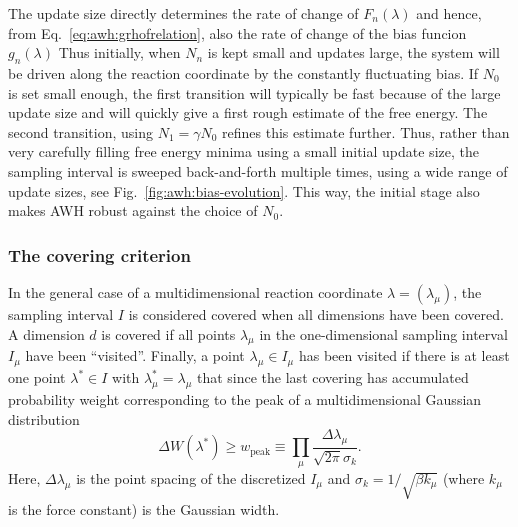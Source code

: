 The update size %
directly determines the rate of change of $F_n(\lambda)$ and hence,
from Eq.~\ref{eq:awh:grhofrelation}, 
also the rate of change of the bias funcion $g_n(\lambda)$ 
Thus initially, when $N_n$ is kept small and updates large,
the system will be driven along the reaction coordinate by the constantly fluctuating bias.
If $N_0$ is set small enough, 
the first transition will typically be fast because of the large update size
and will quickly give a first rough estimate of the free energy.
The second transition, using $N_1=\gamma N_0$  refines this estimate further.
Thus, rather than very carefully filling free energy minima using a small initial update size,
the sampling interval is sweeped back-and-forth multiple times,
using a wide range of update sizes,
see Fig.~\ref{fig:awh:bias-evolution}.
This way, the initial stage also  makes AWH robust against the choice of $N_0$.

\subsubsection{The covering criterion}
In the general case of a multidimensional reaction coordinate $\lambda=(\lambda_\mu)$,
the  sampling interval $I$ is considered covered when all dimensions have been covered.
A dimension $d$ is covered if all points $\lambda_\mu$ in the one-dimensional sampling interval
 $I_\mu$ have been ``visited''.
Finally, a point $\lambda_\mu \in I_\mu$  has been visited  if there is at least one point $\lambda^*\in I$
with $\lambda^*_\mu = \lambda_\mu$
that since the last covering has
accumulated probability weight corresponding to the peak of a
multidimensional Gaussian distribution 
\begin{equation}\label{eq:awh:covering}
\Delta W(\lambda^*)
\ge w_{\mathrm{peak}}
 \equiv \prod_\mu \frac{\Delta \lambda_\mu}{\sqrt{2\pi}\sigma_k}.
\end{equation}
Here, $\Delta \lambda_\mu$ is the point spacing of the discretized  $I_\mu$ %
and $\sigma_k=1/\sqrt{\beta k_\mu}$ (where $k_\mu$ is the force constant)
is the Gaussian width.

